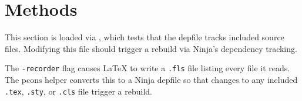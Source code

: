 \section{Methods}
\label{sec:methods}

This section is loaded via \verb||, which tests that
the depfile tracks included source files.  Modifying this file should
trigger a rebuild via Ninja's dependency tracking.

The \texttt{-recorder} flag causes \LaTeX{} to write a \texttt{.fls} file
listing every file it reads.  The pcons helper converts this to a Ninja
depfile so that changes to any included \texttt{.tex}, \texttt{.sty},
or \texttt{.cls} file trigger a rebuild.
